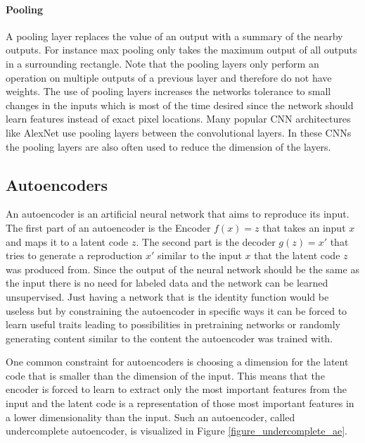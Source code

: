 \paragraph{Pooling}
A pooling layer replaces the value of an output with a summary of the nearby outputs. For instance
max pooling only takes the maximum output of all outputs in a surrounding rectangle. Note that
the pooling layers only perform an operation on multiple outputs of a previous layer and therefore
do not have weights. The use of pooling layers increases the networks tolerance to small changes in
the inputs \parencite{2016-goodfellow-deep} which is most of the time desired since the network should
learn features instead of exact pixel locations. Many popular CNN architectures like 
AlexNet \parencite{2012-krizhevsky-imagenet} use pooling layers between the convolutional layers.
In these CNNs the pooling layers are also often used to reduce the dimension of the layers.


\subsection{Autoencoders}

An autoencoder is an artificial neural network that aims to reproduce its input. The first part
of an autoencoder is the Encoder $f(x)=z$ that takes an input $x$ and maps it to a latent code $z$.
The second part is the decoder $g(z)=x'$ that tries to generate a reproduction $x'$ similar to the
input $x$ that the latent code $z$ was produced from. Since the output of the neural network should
be the same as the input there is no need for labeled data and the network can be learned unsupervised.
Just having a network that is the identity function would be useless but by constraining the autoencoder
in specific ways it can be forced to learn useful traits leading to possibilities in pretraining 
networks or randomly generating content similar to the content the autoencoder was trained with.

One common constraint for autoencoders is choosing a dimension for the latent code that is smaller
than the dimension of the input. This means that the encoder is forced to learn to extract only the
most important features from the input and the latent code is a representation of those most
important features in a lower dimensionality than the input. Such an autoencoder, called
undercomplete autoencoder, is visualized in Figure \ref{figure_undercomplete_ae}.

